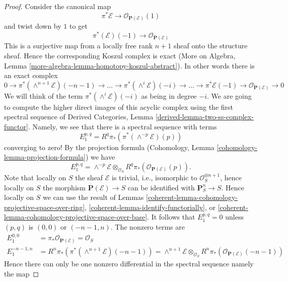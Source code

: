 \begin{proof}

Consider the canonical map
$$
\pi^*\mathcal{E} \longrightarrow \mathcal{O}_{\mathbf{P}(\mathcal{E})}(1)
$$
and twist down by $1$ to get
$$
\pi^*(\mathcal{E})(-1) \longrightarrow \mathcal{O}_{\mathbf{P}(\mathcal{E})}
$$
This is a surjective map from a locally free rank $n + 1$ sheaf onto
the structure sheaf. Hence the corresponding Koszul complex is
exact (More on Algebra, Lemma
\ref{more-algebra-lemma-homotopy-koszul-abstract}).
In other words there is an exact complex
$$
0 \to
\pi^*(\wedge^{n + 1}\mathcal{E})(-n - 1) \to
\ldots \to
\pi^*(\wedge^i\mathcal{E})(-i) \to
\ldots \to
\pi^*\mathcal{E}(-1) \to
\mathcal{O}_{\mathbf{P}(\mathcal{E})} \to 0
$$
We will think of the term $\pi^*(\wedge^i\mathcal{E})(-i)$ as being
in degree $-i$.
We are going to compute the higher direct images
of this acyclic complex using the first spectral sequence of
Derived Categories, Lemma \ref{derived-lemma-two-ss-complex-functor}.
Namely, we see that there is a spectral sequence with terms
$$
E_1^{p, q} = R^q\pi_*\left(\pi^*(\wedge^{-p}\mathcal{E})(p)\right)
$$
converging to zero! By the projection formula
(Cohomology, Lemma \ref{cohomology-lemma-projection-formula})
we have
$$
E_1^{p, q} = \wedge^{-p} \mathcal{E} \otimes_{\mathcal{O}_S}
R^q\pi_*\left(\mathcal{O}_{\mathbf{P}(\mathcal{E})}(p)\right).
$$
Note that locally on $S$ the sheaf $\mathcal{E}$ is trivial,
i.e., isomorphic to $\mathcal{O}_S^{\oplus n + 1}$, hence locally on
$S$ the morphism $\mathbf{P}(\mathcal{E}) \to S$ can be identified
with $\mathbf{P}^n_S \to S$. Hence
locally on $S$ we can use the result of Lemmas
\ref{coherent-lemma-cohomology-projective-space-over-ring},
\ref{coherent-lemma-identify-functorially}, or
\ref{coherent-lemma-cohomology-projective-space-over-base}.
It follows that $E_1^{p, q} = 0$ unless $(p, q)$ is $(0, 0)$
or $(-n - 1, n)$. The nonzero terms are
\begin{align*}
E_1^{0, 0} & = \pi_*\mathcal{O}_{\mathbf{P}(\mathcal{E})} = \mathcal{O}_S \\
E_1^{-n - 1, n} & =
R^n\pi_*\left(\pi^*(\wedge^{n + 1}\mathcal{E})(-n - 1)\right) =
\wedge^{n + 1}\mathcal{E} \otimes_{\mathcal{O}_S}
R^n\pi_*\left(\mathcal{O}_{\mathbf{P}(\mathcal{E})}(-n - 1)\right)
\end{align*}
Hence there can only be one nonzero
differential in the spectral sequence namely the map

\end{proof}
